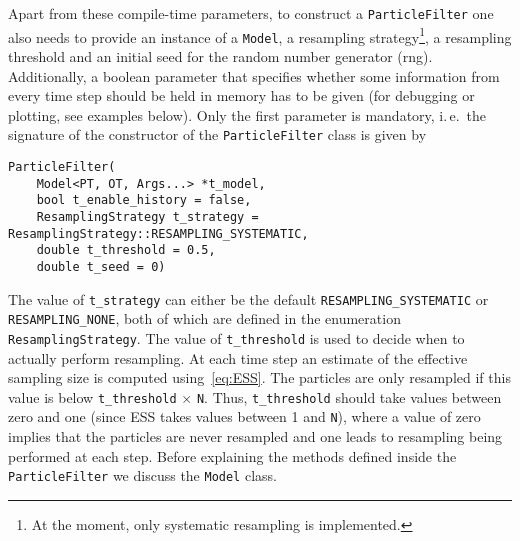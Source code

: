 Apart from these compile-time parameters, to construct a
\texttt{ParticleFilter} one also needs to provide an instance of a
\texttt{Model}, a resampling strategy\footnote{At the moment, only
  systematic resampling is implemented.}, a resampling threshold and
an initial seed for the random number generator (rng). Additionally, a
boolean parameter that specifies whether some information from every
time step should be held in memory has to be given (\eg for debugging
or plotting, see examples below). Only the first parameter is
mandatory, i.\,e.\ the signature of the constructor of the
\texttt{ParticleFilter} class is given by
\begin{verbatim}
ParticleFilter(
    Model<PT, OT, Args...> *t_model,
    bool t_enable_history = false,
    ResamplingStrategy t_strategy = ResamplingStrategy::RESAMPLING_SYSTEMATIC,
    double t_threshold = 0.5, 
    double t_seed = 0)
\end{verbatim}
The value of \texttt{t\_strategy} can either be the default
\texttt{RESAMPLING\_SYSTEMATIC} or \texttt{RESAMPLING\_NONE}, both of
which are defined in the enumeration \texttt{ResamplingStrategy}. The
value of \texttt{t\_threshold} is used to decide when to actually
perform resampling. At each time step an estimate of the effective
sampling size is computed using~\eqref{eq:ESS}. The particles are only
resampled if this value is below \texttt{t\_threshold} $\times$
\texttt{N}. Thus, \texttt{t\_threshold} should take values between
zero and one (since ESS takes values between 1 and \texttt{N}), where
a value of zero implies that the particles are never resampled and one
leads to resampling being performed at each step. Before explaining
the methods defined inside the \texttt{ParticleFilter} we discuss the
\texttt{Model} class.

